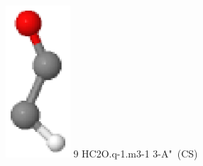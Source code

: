 \documentclass[10pt]{article}
\begin{document}
\begin{tabular}
\includegraphics[width=2.40000000000000000000cm]{HC2O.q-1.m3-1.eps} \tiny{9 \hspace{1.20000000000000000000cm} HC2O.q-1.m3-1 \hspace{5pt} 3-A"~(CS)} 
\\
\end{tabular}
\end{document}
